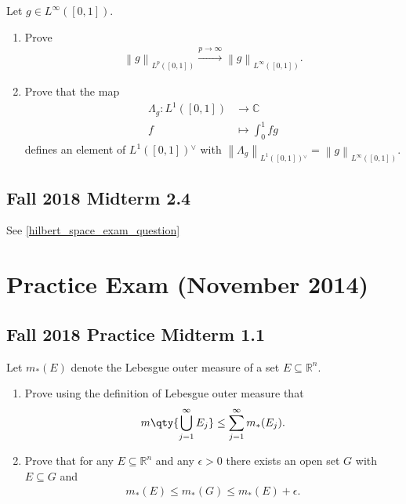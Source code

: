 Let \(g\in L^\infty([0, 1])\).

\begin{enumerate}
\def\labelenumi{\alph{enumi}.}
\item
  Prove
  \begin{align*}
  {\left\lVert {g} \right\rVert}_{L^p([0, 1])}  \overset{p\to\infty}\to {\left\lVert {g} \right\rVert}_{L^\infty([0, 1])}
  .\end{align*}
\item
  Prove that the map
  \begin{align*}
  \Lambda_g: L^1([0, 1]) &\to {\mathbb{C}}\\
  f &\mapsto \int_0^1 fg
  \end{align*}
  defines an element of \(L^1([0, 1]) {}^{ \vee }\) with
  \({\left\lVert {\Lambda_g} \right\rVert}_{L^1([0, 1]) {}^{ \vee }}= {\left\lVert {g} \right\rVert}_{L^\infty([0, 1])}\).
\end{enumerate}

\hypertarget{fall-2018-midterm-2.4}{%
\subsection{Fall 2018 Midterm 2.4}\label{fall-2018-midterm-2.4}}

See \cref{hilbert_space_exam_question}

\hypertarget{practice-exam-november-2014}{%
\section{Practice Exam (November
2014)}\label{practice-exam-november-2014}}

\hypertarget{fall-2018-practice-midterm-1.1}{%
\subsection{Fall 2018 Practice Midterm
1.1}\label{fall-2018-practice-midterm-1.1}}

Let \(m_*(E)\) denote the Lebesgue outer measure of a set
\(E \subseteq {\mathbb{R}}^n\).

\begin{enumerate}
\def\labelenumi{\alph{enumi}.}
\item
  Prove using the definition of Lebesgue outer measure that
  \begin{align*}
  m \qty{ \displaystyle\bigcup_{j=1}^{\infty } E_j  } \leq \sum_{j=1}^{\infty } m_*(E_j) 
  .\end{align*}
\item
  Prove that for any \(E \subseteq {\mathbb{R}}^n\) and any
  \(\epsilon> 0\) there exists an open set \(G\) with \(E \subseteq G\)
  and
  \begin{align*}
  m_*(E) \leq m_*(G) \leq m_*(E) + \epsilon
  .\end{align*}
\end{enumerate}

